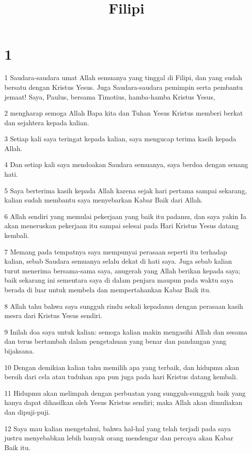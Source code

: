 

\title{Filipi}


\chapter{1}

\par 1 Saudara-saudara umat Allah semuanya yang tinggal di Filipi, dan yang sudah bersatu dengan Kristus Yesus. Juga Saudara-saudara pemimpin serta pembantu jemaat! Saya, Paulus, bersama Timotius, hamba-hamba Kristus Yesus,
\par 2 mengharap semoga Allah Bapa kita dan Tuhan Yesus Kristus memberi berkat dan sejahtera kepada kalian.
\par 3 Setiap kali saya teringat kepada kalian, saya mengucap terima kasih kepada Allah.
\par 4 Dan setiap kali saya mendoakan Saudara semuanya, saya berdoa dengan senang hati.
\par 5 Saya berterima kasih kepada Allah karena sejak hari pertama sampai sekarang, kalian sudah membantu saya menyebarkan Kabar Baik dari Allah.
\par 6 Allah sendiri yang memulai pekerjaan yang baik itu padamu, dan saya yakin Ia akan meneruskan pekerjaan itu sampai selesai pada Hari Kristus Yesus datang kembali.
\par 7 Memang pada tempatnya saya mempunyai perasaan seperti itu terhadap kalian, sebab Saudara semuanya selalu dekat di hati saya. Juga sebab kalian turut menerima bersama-sama saya, anugerah yang Allah berikan kepada saya; baik sekarang ini sementara saya di dalam penjara maupun pada waktu saya berada di luar untuk membela dan mempertahankan Kabar Baik itu.
\par 8 Allah tahu bahwa saya sungguh rindu sekali kepadamu dengan perasaan kasih mesra dari Kristus Yesus sendiri.
\par 9 Inilah doa saya untuk kalian: semoga kalian makin mengasihi Allah dan sesama dan terus bertambah dalam pengetahuan yang benar dan pandangan yang bijaksana.
\par 10 Dengan demikian kalian tahu memilih apa yang terbaik, dan hidupmu akan bersih dari cela atau tuduhan apa pun juga pada hari Kristus datang kembali.
\par 11 Hidupmu akan melimpah dengan perbuatan yang sungguh-sungguh baik yang hanya dapat dihasilkan oleh Yesus Kristus sendiri; maka Allah akan dimuliakan dan dipuji-puji.
\par 12 Saya mau kalian mengetahui, bahwa hal-hal yang telah terjadi pada saya justru menyebabkan lebih banyak orang mendengar dan percaya akan Kabar Baik itu.
